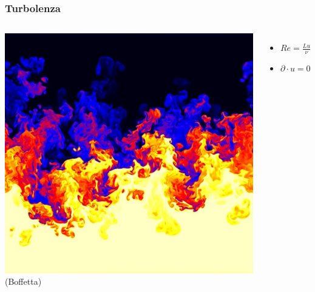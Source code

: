 \begin{frame}
  \frametitle{Turbolenza}
  \begin{columns}

    \includegraphics[width=\textwidth]{../img/Rayleigh-Taylor-Boffetta}
    \\
    (Boffetta)

    \begin{itemize}
      \item $Re = \frac{Lu}{\nu}$
      \item $\partial\cdot u =0$
    \end{itemize}


  \end{columns}
\end{frame}
